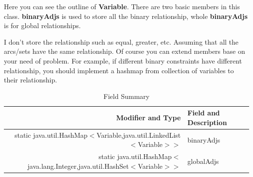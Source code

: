 \documentclass{article}
\begin{document}
Here you can see the outline of \textbf{Variable}. There are two basic members in this class. \textbf{binaryAdjs} is used to store all the binary relationship, whole \textbf{binaryAdjs} is for global relationships. 

I don't store the relationship such as equal, greater, etc. Assuming that all the arcs/sets have the same relationship. Of course you can extend members base on your need of problem. For example, if different binary constraints have different relationship, you should implement a hashmap from collection of variables to their relationship.



\begin{table}[h]
\begin{center}
  \begin{tabular}{ |r | l | }
    \hline
    Modifier and Type & Field and Description \\ \hline
static java.util.HashMap$<$Variable,java.util.LinkedList$<$Variable$>$$>$	&binaryAdjs  \\ \hline
static java.util.HashMap$<$java.lang.Integer,java.util.HashSet$<$Variable$>$$>$	&globalAdjs  \\ \hline

  \end{tabular}
\caption{Field Summary}
\end{center}
\end{table}
\end{document}
